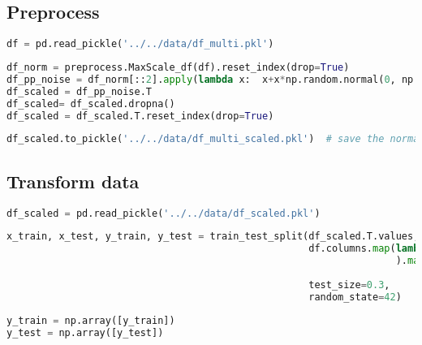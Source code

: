 \hypertarget{preprocess-3}{%
\subsection*{Preprocess}\label{preprocess-3}}

\begin{lstlisting}[language=Python]
df = pd.read_pickle('../../data/df_multi.pkl')
\end{lstlisting}

\begin{lstlisting}[language=Python]
df_norm = preprocess.MaxScale_df(df).reset_index(drop=True)                                                    # each spectrum is scaled to 1
df_pp_noise = df_norm[::2].apply(lambda x:  x+x*np.random.normal(0, np.random.randint(1,3)*0.01 , len(x)))     # reduce size to 1024 and add noise
df_scaled = df_pp_noise.T
df_scaled= df_scaled.dropna()
df_scaled = df_scaled.T.reset_index(drop=True)
\end{lstlisting}

\begin{lstlisting}[language=Python]
df_scaled.to_pickle('../../data/df_multi_scaled.pkl')  # save the normalized, scaled df
\end{lstlisting}

\hypertarget{transform-data}{%
\subsection*{Transform data}\label{transform-data}}

\begin{lstlisting}[language=Python]
df_scaled = pd.read_pickle('../../data/df_scaled.pkl')
\end{lstlisting}

\begin{lstlisting}[language=Python]
x_train, x_test, y_train, y_test = train_test_split(df_scaled.T.values,
                                                    df.columns.map(lambda x: x.split('_')[:-1]
                                                                   ).map(base.pair_list_to_tuples
                                                                         ).map(base.one_hot_encode_concentrations),
                                                    test_size=0.3,
                                                    random_state=42)
\end{lstlisting}

\begin{lstlisting}[language=Python]
y_train = np.array([y_train])
y_test = np.array([y_test])
\end{lstlisting}

